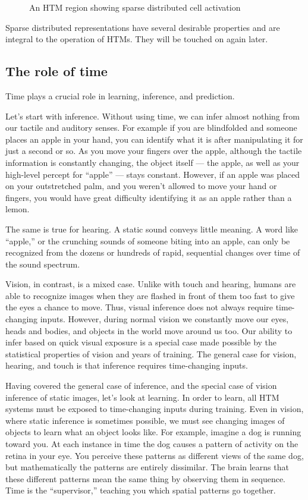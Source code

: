 \documentclass{report}
\begin{document}
\begin{figure}
\caption{An HTM region showing sparse distributed cell activation}
\label{figure:sparse-activation}
\end{figure}

Sparse distributed representations have several desirable properties
and are integral to the operation of HTMs. They will be touched on
again later.

\subsection*{The role of time}

Time plays a crucial role in learning, inference, and prediction.

Let's start with inference. Without using time, we can infer almost
nothing from our tactile and auditory senses. For example if you are
blindfolded and someone places an apple in your hand, you can identify
what it is after manipulating it for just a second or so. As you move
your fingers over the apple, although the tactile information is
constantly changing, the object itself --- the apple, as well as your
high-level percept for ``apple'' --- stays constant. However, if an
apple was placed on your outstretched palm, and you weren't allowed to
move your hand or fingers, you would have great difficulty identifying
it as an apple rather than a lemon.

The same is true for hearing. A static sound conveys little meaning. A
word like ``apple,'' or the crunching sounds of someone biting into an
apple, can only be recognized from the dozens or hundreds of rapid,
sequential changes over time of the sound spectrum.

Vision, in contrast, is a mixed case. Unlike with touch and hearing,
humans are able to recognize images when they are flashed in front of
them too fast to give the eyes a chance to move. Thus, visual
inference does not always require time-changing inputs. However,
during normal vision we constantly move our eyes, heads and bodies,
and objects in the world move around us too. Our ability to infer
based on quick visual exposure is a special case made possible by the
statistical properties of vision and years of training. The general
case for vision, hearing, and touch is that inference requires
time-changing inputs.

Having covered the general case of inference, and the special case of
vision inference of static images, let's look at learning. In order to
learn, all HTM systems must be exposed to time-changing inputs during
training. Even in vision, where static inference is sometimes
possible, we must see changing images of objects to learn what an
object looks like. For example, imagine a dog is running toward
you. At each instance in time the dog causes a pattern of activity on
the retina in your eye. You perceive these patterns as different views
of the same dog, but mathematically the patterns are entirely
dissimilar. The brain learns that these different patterns mean the
same thing by observing them in sequence. Time is the ``supervisor,''
teaching you which spatial patterns go together.
\end{document}
